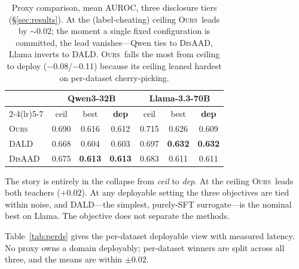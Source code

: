 \documentclass[11pt]{article}
\newcommand{\ours}{\textsc{Ours}}
\newcommand{\dald}{\textsc{DALD}}
\newcommand{\disaad}{\textsc{DisAAD}}
\newcommand{\best}[1]{\textbf{#1}}
\begin{document}
\begin{table}[t]\centering\small
\setlength{\tabcolsep}{3.2pt}
\begin{tabular}{l ccc ccc}
\toprule
& \multicolumn{3}{c}{\textbf{Qwen3-32B}} & \multicolumn{3}{c}{\textbf{Llama-3.3-70B}}\\
\cmidrule(lr){2-4}\cmidrule(lr){5-7}
& ceil & best & \best{dep} & ceil & best & \best{dep}\\
\midrule
\ours   & 0.690 & 0.616 & 0.612 & 0.715 & 0.626 & 0.609\\
\dald   & 0.668 & 0.604 & 0.603 & 0.697 & \best{0.632} & \best{0.632}\\
\disaad & 0.675 & \best{0.613} & \best{0.613} & 0.683 & 0.611 & 0.611\\
\bottomrule
\end{tabular}
\caption{Proxy comparison, mean AUROC, three disclosure tiers (\S\ref{sec:results}).
At the (label-cheating) ceiling \ours\ leads by $\sim$0.02; the moment a single fixed
configuration is committed, the lead vanishes---Qwen ties to \disaad, Llama inverts to
\dald. \ours\ falls the most from ceiling to deploy ($-$0.08/$-$0.11) because its ceiling
leaned hardest on per-dataset cherry-picking.}
\label{tab:triptych}
\end{table}

The story is entirely in the collapse from \emph{ceil} to \emph{dep}. At the ceiling
\ours\ leads both teachers ($+0.02$). At any deployable setting the three objectives are
tied within noise, and \dald---the simplest, purely-SFT surrogate---is the nominal best
on Llama. The objective does not separate the methods.

Table~\ref{tab:perds} gives the per-dataset deployable view with measured latency. No
proxy owns a domain deployably; per-dataset winners are split across all three, and the
means are within $\pm0.02$.
\end{document}
